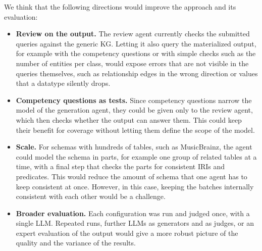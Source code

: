 We think that the following directions would improve the approach and its evaluation:
\begin{itemize}[leftmargin=*, itemsep=2pt]
  \item \textbf{Review on the output.} The review agent currently checks the submitted queries against the generic KG. Letting it also query the materialized output, for example with the competency questions or with simple checks such as the number of entities per class, would expose errors that are not visible in the queries themselves, such as relationship edges in the wrong direction or values that a datatype silently drops.
  \item \textbf{Competency questions as tests.} Since competency questions narrow the model of the generation agent, they could be given only to the review agent, which then checks whether the output can answer them. This could keep their benefit for coverage without letting them define the scope of the model.
  \item \textbf{Scale.} For schemas with hundreds of tables, such as MusicBrainz, the agent could model the schema in parts, for example one group of related tables at a time, with a final step that checks the parts for consistent IRIs and predicates. This would reduce the amount of schema that one agent has to keep consistent at once. However, in this case, keeping the batches internally consistent with each other would be a challenge.
  \item \textbf{Broader evaluation.} Each configuration was run and judged once, with a single LLM. Repeated runs, further LLMs as generators and as judges, or an expert evaluation of the output would give a more robust picture of the quality and the variance of the results.
\end{itemize}
